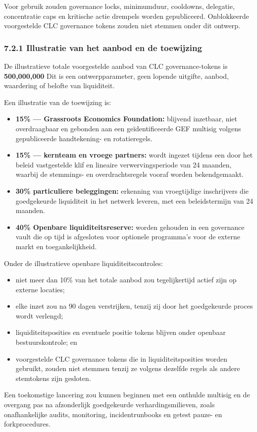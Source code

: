 \documentclass[11pt]{article}
\begin{document}
Voor gebruik zouden governance locks, minimumduur, cooldowns, delegatie, concentratie caps en kritische actie drempels worden gepubliceerd. Onblokkeerde voorgestelde CLC governance tokens zouden niet stemmen onder dit ontwerp.

\subsubsection*{7.2.1 Illustratie van het aanbod en de toewijzing}

De illustratieve totale voorgestelde aanbod van CLC governance-tokens is \textbf{500,000,000} Dit is een ontwerpparameter, geen lopende uitgifte, aanbod, waardering of belofte van liquiditeit.

Een illustratie van de toewijzing is:

\begin{itemize}[leftmargin=*]
\item \textbf{15\% --- Grassroots Economics Foundation:} blijvend inzetbaar, niet overdraagbaar en gebonden aan een geïdentificeerde GEF multisig volgens gepubliceerde handtekening- en rotatieregels.
\item \textbf{15\% --- kernteam en vroege partners:} wordt ingezet tijdens een door het beleid vastgestelde klif en lineaire verwervingsperiode van 24 maanden, waarbij de stemmings- en overdrachtsregels vooraf worden bekendgemaakt.
\item \textbf{30\%  particuliere beleggingen:} erkenning van vroegtijdige inschrijvers die goedgekeurde liquiditeit in het netwerk leveren, met een beleidstermijn van 24 maanden.
\item \textbf{40\%  Openbare liquiditeitsreserve:} worden gehouden in een governance vault die op tijd is afgesloten voor optionele programma's voor de externe markt en toegankelijkheid.
\end{itemize}
Onder de illustratieve openbare liquiditeitscontroles:

\begin{itemize}[leftmargin=*]
\item niet meer dan 10\% van het totale aanbod zou tegelijkertijd actief zijn op externe locaties;
\item elke inzet zou na 90 dagen verstrijken, tenzij zij door het goedgekeurde proces wordt verlengd;
\item liquiditeitsposities en eventuele positie tokens blijven onder openbaar bestuurskontrole; en
\item voorgestelde CLC governance tokens die in liquiditeitsposities worden gebruikt, zouden niet stemmen tenzij ze volgens dezelfde regels als andere stemtokens zijn gesloten.
\end{itemize}
Een toekomstige lancering zou kunnen beginnen met een onthulde multisig en de overgang pas na afzonderlijk goedgekeurde verhardingsmilieven, zoals onafhankelijke audits, monitoring, incidentrunbooks en getest pauze- en forkprocedures.
\end{document}
